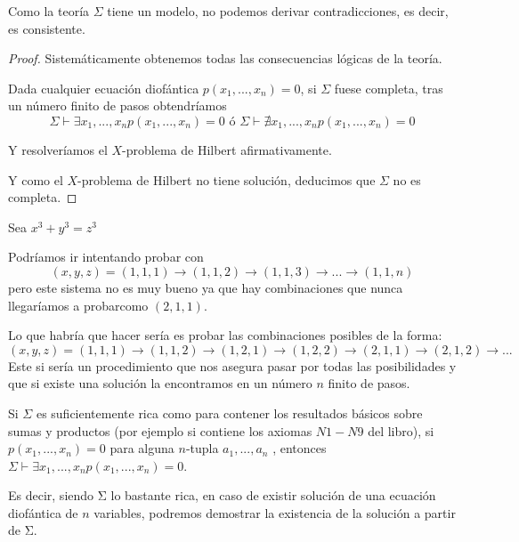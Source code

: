 \obs Como la teoría $Σ$ tiene un modelo, no podemos derivar contradicciones, es decir, es consistente.

\begin{proof}
Sistemáticamente obtenemos todas las consecuencias lógicas de la teoría.

Dada cualquier ecuación diofántica $p(x_1,...,x_n) = 0$, si $Σ$ fuese completa, tras un número finito de pasos obtendríamos
\[Σ\vdash ∃x_1,...,x_n p(x_1,...,x_n) = 0 \text{ ó } Σ\vdash \nexists x_1,...,x_n p(x_1,...,x_n) = 0\]

Y resolveríamos el $X$-problema de Hilbert afirmativamente.

Y como el $X$-problema de Hilbert no tiene solución, deducimos que $Σ$ no es completa.
\end{proof}



\begin{example}
Sea $x^3 + y^3 = z^3$

Podríamos ir intentando probar con
\[(x,y,z) = (1,1,1) \to (1,1,2) \to (1,1,3) \to ... \to (1,1,n)\]
pero este sistema no es muy bueno ya que hay combinaciones que nunca llegaríamos a probarcomo $(2,1,1)$.

Lo que habría que hacer sería es probar las combinaciones posibles de la forma:
\[(x,y,z) = (1,1,1) \to (1,1,2) \to (1,2,1) \to (1,2,2) \to (2,1,1) \to (2,1,2) \to ...\]
Este si sería un procedimiento que nos asegura pasar por todas las posibilidades y que si existe una solución la encontramos en un número $n$ finito de pasos.
\end{example}

\obs Si $Σ$ es suficientemente rica como para contener los resultados básicos sobre sumas y productos (por ejemplo si contiene los axiomas $N1 - N9$ del libro), si $p(x_1,...,x_n) = 0$ para alguna $n$-tupla $a_1,...,a_n$ , entonces $Σ\vdash ∃x_1,...,x_n p(x_1,...,x_n ) = 0$.

Es decir, siendo Σ lo bastante rica, en caso de existir solución de una ecuación diofántica de $n$ variables, podremos demostrar la existencia de la solución a partir de Σ.


